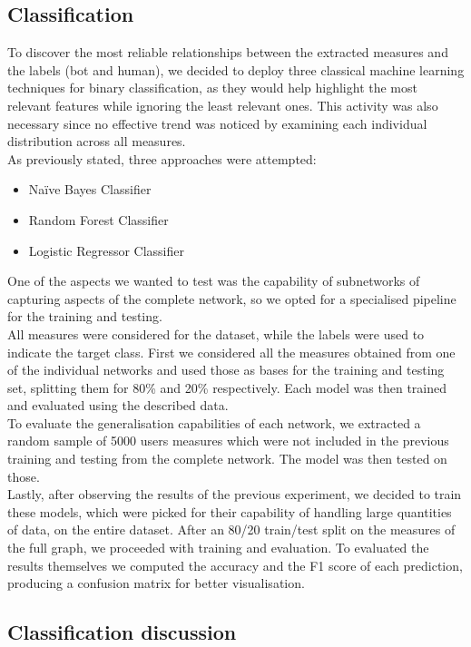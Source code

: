 \documentclass[12pt, a4paper]{article}
\begin{document}
    \subsection{Classification}
    	To discover the most reliable relationships between the extracted measures and the labels (bot and human), we decided to deploy three classical machine learning techniques for binary classification, as they would help highlight the most relevant features while ignoring the least relevant ones. This activity was also necessary since no effective trend was noticed by examining each individual distribution across all measures.\\
    	As previously stated, three approaches were attempted:
    	\begin{itemize}
        	\item Na\"ive Bayes Classifier
        	\item Random Forest Classifier
        	\item Logistic Regressor Classifier
    	\end{itemize}
    	One of the aspects we wanted to test was the capability of subnetworks of capturing aspects of the complete network, so we opted for a specialised pipeline for the training and testing.\\
    	All measures were considered for the dataset, while the labels were used to indicate the target class. First we considered all the measures obtained from one of the individual networks and used those as bases for the training and testing set, splitting them for 80\% and 20\% respectively. Each model was then trained and evaluated using the described data.\\
    	To evaluate the generalisation capabilities of each network, we extracted a random sample of 5000 users measures which were not included in the previous training and testing from the complete network. The model was then tested on those.\\
    	Lastly, after observing the results of the previous experiment, we decided to train these models, which were picked for their capability of handling large quantities of data, on the entire dataset. After an 80/20 train/test split on the measures of the full graph, we proceeded with training and evaluation.
    	To evaluated the results themselves we computed the accuracy and the F1 score of each prediction, producing a confusion matrix for better visualisation.
    \subsection{Classification discussion}
		
\end{document}
